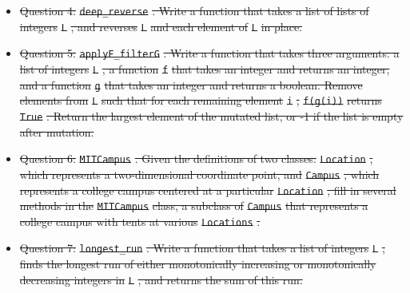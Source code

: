 \documentclass[12pt,twoside]{mitthesis}
\providecommand{\DIFdeltex}[1]{{\protect\color{red}\sout{#1}}}                      %
\providecommand{\DIFdel}[1]{\texorpdfstring{\DIFdeltex{#1}}{}} %
\begin{document}
 \begin{itemize} %
\item%
\DIFdel{Question 4: }\texttt{\DIFdel{deep\_reverse}}%
\DIFdel{. Write a function that takes a list of lists of integers }\texttt{\DIFdel{L}}%
\DIFdel{, and reverses }\texttt{\DIFdel{L}} %
\DIFdel{and each element of }\texttt{\DIFdel{L}} %
\DIFdel{in place.
}%


\item%
\DIFdel{Question 5: }\texttt{\DIFdel{applyF\_filterG}}%
\DIFdel{. Write a function that takes three arguments: a list of integers }\texttt{\DIFdel{L}}%
\DIFdel{, a function }\texttt{\DIFdel{f}} %
\DIFdel{that takes an integer and returns an integer, and a function }\texttt{\DIFdel{g}} %
\DIFdel{that takes an integer and returns a boolean. Remove elements from }\texttt{\DIFdel{L}} %
\DIFdel{such that for each remaining element }\texttt{\DIFdel{i}}%
\DIFdel{, }\texttt{\DIFdel{f(g(i))}} %
\DIFdel{returns }\texttt{\DIFdel{True}}%
\DIFdel{. Return the largest element of the mutated list, or -1 if the list is empty after mutation.
}%


\item%
\DIFdel{Question 6: }\texttt{\DIFdel{MITCampus}}%
\DIFdel{. Given the definitions of two classes: }\texttt{\DIFdel{Location}}%
\DIFdel{, which represents a two-dimensional coordinate point, and }\texttt{\DIFdel{Campus}}%
\DIFdel{, which represents a college campus centered at a particular }\texttt{\DIFdel{Location}}%
\DIFdel{, fill in several methods in the }\texttt{\DIFdel{MITCampus}} %
\DIFdel{class, a subclass of }\texttt{\DIFdel{Campus}} %
\DIFdel{that represents a college campus with tents at various }\texttt{\DIFdel{Locations}}%
\DIFdel{.
}%


\item%
\DIFdel{Question 7: }\texttt{\DIFdel{longest\_run}}%
\DIFdel{. Write a function that takes a list of integers }\texttt{\DIFdel{L}}%
\DIFdel{, finds the longest run of either monotonically increasing or monotonically decreasing integers in }\texttt{\DIFdel{L}}%
\DIFdel{, and returns the sum of this run.
}%


 \end{itemize} %
\end{document}
